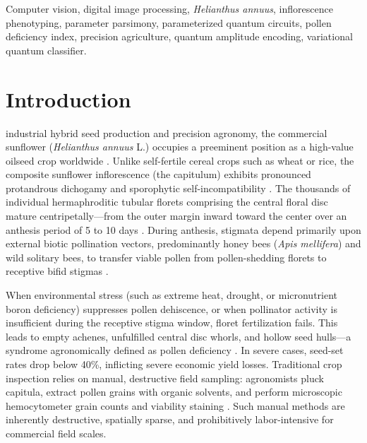 \documentclass{ieeeaccess}
\begin{document}
\begin{keywords}
Computer vision, digital image processing, \textit{Helianthus annuus}, inflorescence phenotyping, parameter parsimony, parameterized quantum circuits, pollen deficiency index, precision agriculture, quantum amplitude encoding, variational quantum classifier.
\end{keywords}

\titlepgskip=-15pt
\maketitle

\section{Introduction}
\label{sec:introduction}
 industrial hybrid seed production and precision agronomy, the commercial sunflower (\textit{Helianthus annuus} L.) occupies a preeminent position as a high-value oilseed crop worldwide \cite{jing2024sunflower}. Unlike self-fertile cereal crops such as wheat or rice, the composite sunflower inflorescence (the capitulum) exhibits pronounced protandrous dichogamy and sporophytic self-incompatibility \cite{aslan2023sunflower}. The thousands of individual hermaphroditic tubular florets comprising the central floral disc mature centripetally---from the outer margin inward toward the center over an anthesis period of 5 to 10 days \cite{mallinger2015species}. During anthesis, stigmata depend primarily upon external biotic pollination vectors, predominantly honey bees (\textit{Apis mellifera}) and wild solitary bees, to transfer viable pollen from pollen-shedding florets to receptive bifid stigmas \cite{rice2024uav}.

When environmental stress (such as extreme heat, drought, or micronutrient boron deficiency) suppresses pollen dehiscence, or when pollinator activity is insufficient during the receptive stigma window, floret fertilization fails. This leads to empty achenes, unfulfilled central disc whorls, and hollow seed hulls---a syndrome agronomically defined as pollen deficiency \cite{iamchuen2026automated}. In severe cases, seed-set rates drop below 40\%, inflicting severe economic yield losses. Traditional crop inspection relies on manual, destructive field sampling: agronomists pluck capitula, extract pollen grains with organic solvents, and perform microscopic hemocytometer grain counts and viability staining \cite{haralick1973textural}. Such manual methods are inherently destructive, spatially sparse, and prohibitively labor-intensive for commercial field scales.
\end{document}
